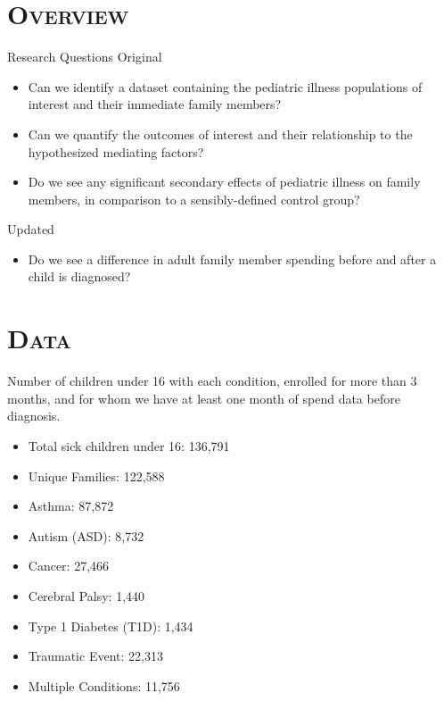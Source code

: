 \documentclass[xcolor=x11names,compress]{beamer}
\renewcommand{\(}{\begin{columns}}
\renewcommand{\)}{\end{columns}}
\newcommand{\<}[1]{\begin{column}{#1}}
\renewcommand{\>}{\end{column}}
\begin{document}


\section{\scshape Overview}

\begin{frame}{Research Questions}
Original
\begin{itemize}
	\item Can we identify a dataset containing the pediatric illness populations of interest and their immediate family members? 
	\item Can we quantify the outcomes of interest and their relationship to the hypothesized mediating factors? 
	\item Do we see any significant secondary effects of pediatric illness on family members, in comparison to a sensibly-defined control group? 
\end{itemize}
Updated 
\begin{itemize}
	\item Do we see a difference in adult family member spending before and after a child is diagnosed?
\end{itemize}
\end{frame}

\section{\scshape Data}

\begin{frame}
Number of children under 16 with each condition, enrolled for more than 3 months, and for whom we have at least one month of spend data before diagnosis. 
\begin{itemize}
	\item Total sick children under 16: 136,791
	\item Unique Families: 122,588 
	\item Asthma:  87,872
	\item Autism (ASD): 8,732
	\item Cancer: 27,466
	\item Cerebral Palsy: 1,440
	\item Type 1 Diabetes (T1D): 1,434
	\item Traumatic Event: 22,313
	\item Multiple Conditions: 11,756
\end{itemize}	
\end{frame}
\end{document}
